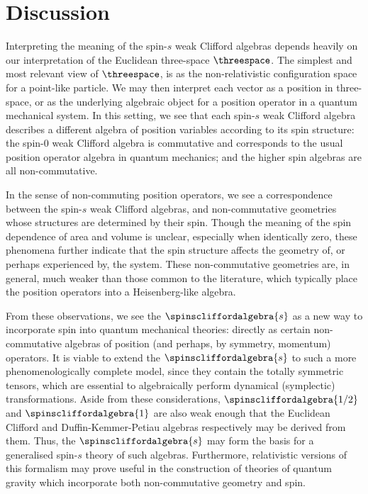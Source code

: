 \documentclass{article}
\begin{document}
\section{Discussion}\label{sec:discussion}

Interpreting the meaning of the spin-$s$ weak Clifford algebras depends heavily on our interpretation of the Euclidean three-space $\threespace$. The simplest and most relevant view of $\threespace$, is as the non-relativistic configuration space for a point-like particle. We may then interpret each vector as a position in three-space, or as the underlying algebraic object for a position operator in a quantum mechanical system. In this setting, we see that each spin-$s$ weak Clifford algebra describes a different algebra of position variables according to its spin structure: the spin-$0$ weak Clifford algebra is commutative and corresponds to the usual position operator algebra in quantum mechanics; and the higher spin algebras are all non-commutative.

In the sense of non-commuting position operators, we see a correspondence between the spin-$s$ weak Clifford algebras, and non-commutative geometries whose structures are determined by their spin. Though the meaning of the spin dependence of area and volume is unclear, especially when identically zero, these phenomena further indicate that the spin structure affects the geometry of, or perhaps experienced by, the system. These non-commutative geometries are, in general, much weaker than those common to the literature\cite{szabo,aschieri,frob}, which typically place the position operators into a Heisenberg-like\cite{schempp,wallach} algebra.

From these observations, we see the $\spinscliffordalgebra{s}$ as a new way to incorporate spin into quantum mechanical theories: directly as certain non-commutative algebras of position (and perhaps, by symmetry, momentum) operators. It is viable to extend the $\spinscliffordalgebra{s}$ to such a more phenomenologically complete model, since they contain the totally symmetric tensors, which are essential to algebraically perform dynamical (symplectic) transformations\cite{fulton-harris,crumeyrolle}. Aside from these considerations, $\spinscliffordalgebra{1/2}$ and $\spinscliffordalgebra{1}$ are also weak enough that the Euclidean Clifford and Duffin-Kemmer-Petiau\cite{fischbach,helmstetter,micali} algebras respectively may be derived from them. Thus, the $\spinscliffordalgebra{s}$ may form the basis for a generalised spin-$s$ theory of such algebras. Furthermore, relativistic versions of this formalism may prove useful in the construction of theories of quantum gravity which incorporate both non-commutative geometry and spin. 
\end{document}
